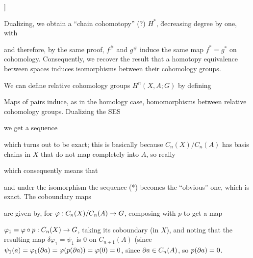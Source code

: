 ]

Dualizing, we obtain a ``chain cohomotopy'' (?) $H^*$, \u{decreasing} degree by one, with


and therefore, by the same proof, $f^\#$ and $g^\#$ induce
the same map $f^*=g^*$ on cohomology. Consequently, we recover the result that a homotopy
equivalence between spaces induces isomorphisms between their cohomology groups.

\vfill
\eject

We can define relative cohomology groups $H^n(X,A;G)$ by defining


Maps of pairs induce, as in the homology case, homomorphisms between relative
cohomology groups.
Dualizing  the SES

\ssk


\ssk

we get a sequence


\ssk

which turns out to be exact; this is basically because $C_n(X)/C_n(A)$ has basis
chains in $X$ that do not map completely into $A$, so really

\ssk


\ssk

which consequently means that

\ssk


\ssk

and under
the isomorphism the sequence (*) becomes the ``obvious'' one, which is exact.
The coboundary maps 

\ssk


\ssk

are given by, for $\varphi: C_n(X)/C_n(A)\rightarrow G$, composing with $p$ to get
a map 

$\varphi_1=\varphi\circ p:C_n(X)\rightarrow G$, taking its coboundary (in $X$), and noting that
the resulting map $\delta\varphi_1=\psi_1$ is $0$ on $C_{n+1}(A)$ (since
$\psi_1(a)=\varphi_1(\partial a)=\varphi(p(\partial a)) = \varphi(0) = 0$, since 
$\partial a\in C_n(A)$, so $p(\partial a) = 0$.

